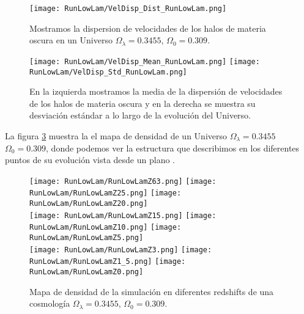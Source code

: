 \begin{figure}[H]
    \centering
    \texttt{[image: RunLowLam/VelDisp\_Dist\_RunLowLam.png]}
    \caption[Distribución de la dispersión de velocidades]{\footnotesize Mostramos la dispersion de velocidades de los halos de materia oscura en un Universo $\Omega_\lambda = 0.3455$, $\Omega_0 = 0.309$.}
    \label{fig:LowLam-VelDispDist}
\end{figure}

\begin{figure}[H]
    \centering
    \texttt{[image: RunLowLam/VelDisp\_Mean\_RunLowLam.png]}
    \texttt{[image: RunLowLam/VelDisp\_Std\_RunLowLam.png]}
    \caption[Media y desviación estándar de la dispersión de velocidades]{\footnotesize En la izquierda mostramos la media de la dispersión de velocidades de los halos de materia oscura y en la derecha se muestra su desviación estándar a lo largo de la evolución del Universo.}
    \label{fig:LowLam-VelDispStats}
\end{figure}

La figura \ref{fig:LowLam-DensityMap} muestra la el mapa de densidad de un Universo $\Omega_\lambda = 0.3455$ $\Omega_0 = 0.309$, donde podemos ver la estructura que describimos  en los diferentes puntos de su evolución vista desde un plano .
\begin{figure}[H]
    \centering

    \texttt{[image: RunLowLam/RunLowLamZ63.png]}   %
    \texttt{[image: RunLowLam/RunLowLamZ25.png]}   %
    \texttt{[image: RunLowLam/RunLowLamZ20.png]}   %
    \\
    \texttt{[image: RunLowLam/RunLowLamZ15.png]}   %
    \texttt{[image: RunLowLam/RunLowLamZ10.png]}   %
    \texttt{[image: RunLowLam/RunLowLamZ5.png]}    %
    \\
    \texttt{[image: RunLowLam/RunLowLamZ3.png]}    %
    \texttt{[image: RunLowLam/RunLowLamZ1\_5.png]}  %
    \texttt{[image: RunLowLam/RunLowLamZ0.png]}    %
    \caption[Mapa de densidad en en diferentes redshift]{ \footnotesize Mapa de densidad de la simulación en diferentes redshifts de una cosmología $\Omega_\lambda = 0.3455$, $\Omega_0 = 0.309$. }
    \label{fig:LowLam-DensityMap}
\end{figure}


